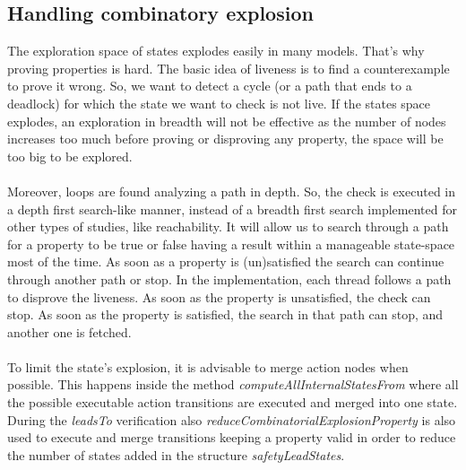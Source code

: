 \documentclass[12pt]{article}
\begin{document}
\subsection{Handling combinatory explosion}
The exploration space of states explodes easily in many models. That's why proving properties is hard. The basic idea of liveness is to find a counterexample to prove it wrong. So, we want to detect a cycle (or a path that ends to a deadlock) for which the state we want to check is not live. If the states space explodes, an exploration in breadth will not be effective as the number of nodes increases too much before proving or disproving any property, the space will be too big to be explored.
\\\\
Moreover, loops are found analyzing a path in depth. So, the check is executed in a depth first search-like manner, instead of a breadth first search implemented for other types of studies, like reachability. It will allow us to search through a path for a property to be true or false having a result within a manageable state-space most of the time. As soon as a property is (un)satisfied the search can continue through another path or stop. In the implementation, each thread follows a path to disprove the liveness. As soon as the property is unsatisfied, the check can stop. As soon as the property is satisfied, the search in that path can stop, and another one is fetched.
\\\\
To limit the state's explosion, it is advisable to merge action nodes when possible. This happens inside the method \textit{computeAllInternalStatesFrom} where all the possible executable action transitions are executed and merged into one state. During the \textit{leadsTo} verification also \textit{reduceCombinatorialExplosionProperty} is also used to execute and merge transitions keeping a property valid in order to reduce the number of states added in the structure \textit{safetyLeadStates}.
\end{document}

